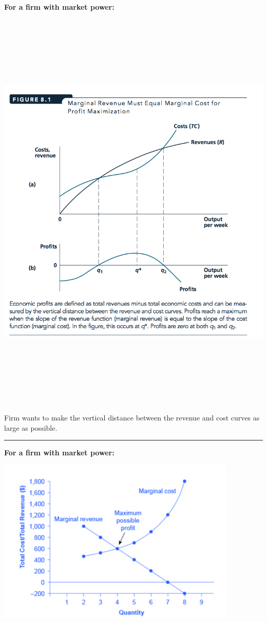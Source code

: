 \documentclass[]{article}
\begin{document}
\textbf{For a firm with market power:}

\includegraphics[height=7.8in]{picsfigs/fig8-1.png}

Firm wants to make the vertical distance between the revenue and cost
curves as large as possible.

\begin{center}\rule{0.5\linewidth}{\linethickness}\end{center}

\textbf{For a firm with market power:}

\includegraphics[width=4.5in]{picsfigs/monopmcmr.png}
\end{document}
